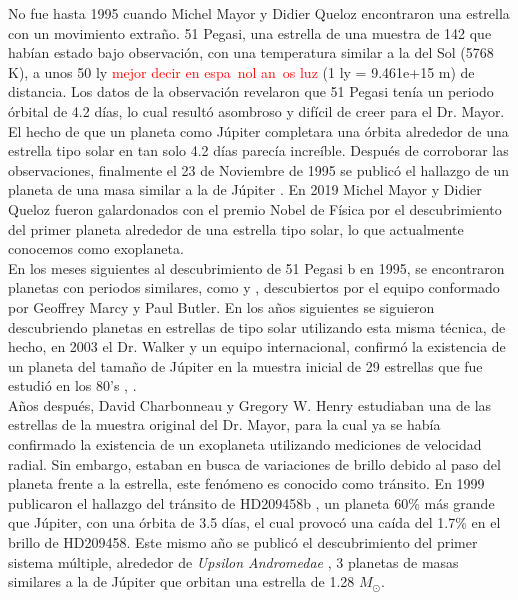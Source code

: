 No fue hasta 1995 cuando Michel Mayor y Didier Queloz encontraron una estrella con un movimiento extraño. 51 Pegasi, una estrella de una muestra de 142 que habían estado bajo observación, con una temperatura similar a la del Sol (5768 K), a unos 50 ly \textcolor{red}{mejor decir en espa~nol an~os luz} (1 ly = 9.461e+15 m) de distancia. Los datos de la observación revelaron que 51 Pegasi tenía un periodo órbital de 4.2 días, lo cual resultó asombroso y difícil de creer para el Dr. Mayor. El hecho de que un planeta como Júpiter completara una órbita alrededor de una estrella tipo solar en tan solo 4.2 días parecía increíble. Después de corroborar las observaciones, finalmente el 23 de Noviembre de 1995 se publicó el hallazgo de un planeta de una masa similar a la de Júpiter \cite{mayor1995jupiter}. En 2019 Michel Mayor y Didier Queloz fueron galardonados con el premio Nobel de Física por el descubrimiento del primer planeta alrededor de una estrella tipo solar, lo que actualmente conocemos como exoplaneta.\\

En los meses siguientes al descubrimiento de 51 Pegasi b en 1995, se encontraron planetas con periodos similares, como \cite{Marcy_1996} y \cite{butler1996planet}, descubiertos por el equipo conformado por Geoffrey Marcy y Paul Butler. En los años siguientes se siguieron descubriendo planetas en estrellas de tipo solar utilizando esta misma técnica, de hecho, en 2003 el Dr. Walker y un equipo internacional, confirmó la existencia de un planeta del tamaño de Júpiter en la muestra inicial de 29 estrellas que fue estudió en los 80's \cite{hatzes2003planetary}, \cite{walker2012first}.\\

Años después, David Charbonneau y Gregory W. Henry estudiaban una de las estrellas de la muestra original del Dr. Mayor, para la cual ya se había confirmado la existencia de un exoplaneta utilizando mediciones de velocidad radial. Sin embargo, estaban en busca de variaciones de brillo debido al paso del planeta frente a la estrella, este fenómeno es conocido como tránsito. En 1999 publicaron el hallazgo del tránsito de HD209458b \cite{charbonneau1999detection}, un planeta 60\% más grande que Júpiter, con una órbita de 3.5 días, el cual provocó una caída del 1.7\% en el brillo de HD209458. Este mismo año se publicó el descubrimiento del primer sistema múltiple, alrededor de \textit{Upsilon Andromedae} \cite{marcy1999three}, 3 planetas de masas similares a la de Júpiter que orbitan una estrella de 1.28 $M_{\odot}$.\\

